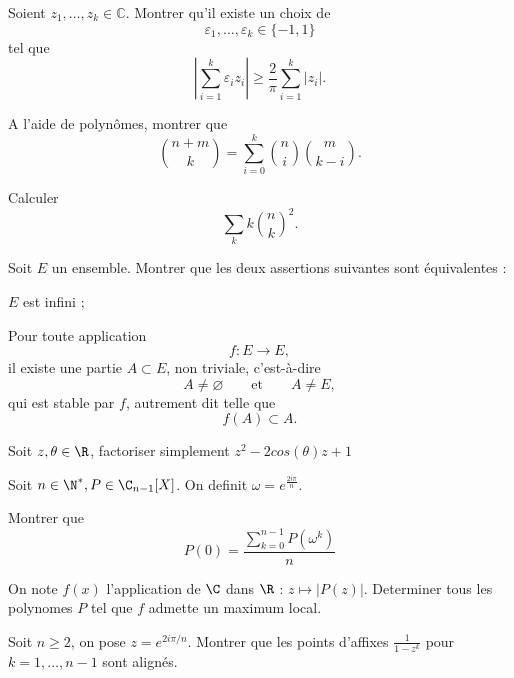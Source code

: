 \documentclass[11pt,a4paper]{article}
\begin{document}
\begin{exercise}
Soient $z_1,\ldots,z_k\in\mathbb{C}$.
Montrer qu'il existe un choix de
\[
\varepsilon_1,\ldots,\varepsilon_k\in\{-1,1\}
\]
tel que
\[
\left|\sum_{i=1}^k \varepsilon_i z_i\right|
\geq
\frac{2}{\pi}\sum_{i=1}^k |z_i|.
\]
\end{exercise}

\begin{exercise}
\begin{questions}
    A l'aide de polynômes, montrer que
    \[
    \binom{n+m}{k}
    =
    \sum_{i=0}^k
    \binom{n}{i}
    \binom{m}{k-i}.
    \]
    \item Calculer
    \[
    \sum_k k\binom{n}{k}^2.
    \]
\end{questions}
\end{exercise}
\begin{exercise}
Soit $E$ un ensemble. Montrer que les deux assertions suivantes sont équivalentes :
\begin{questions}
    \item $E$ est infini ;
    \item Pour toute application
    \[
    f:E\to E,
    \]
    il existe une partie $A\subset E$, non triviale, c'est-à-dire
    \[
    A\neq\varnothing
    \qquad\text{et}\qquad
    A\neq E,
    \]
    qui est stable par $f$, autrement dit telle que
    \[
    f(A)\subset A.
    \]
\end{questions}
\end{exercise}

\begin{exercise}
Soit $z,\theta\in\R$, factoriser simplement $z^2-2cos(\theta)z+1$
\end{exercise}

\begin{exercise}
Soit $n\in \N^*, P\in \C_{n-1}[X]$.
On definit $\omega=e^{\frac{2i\pi}n}$.
\begin{questions}
\item Montrer que $$P(0)=\frac{\sum_{k=0}^{n-1}P(\omega^k)}n$$

\item On note $f(x)$ l'application de $\C$ dans $\R$ : $z\mapsto|P(z)|$.
Determiner tous les polynomes $P$ tel que $f$ admette un maximum local. 
\end{questions}
\end{exercise}

\begin{exercise}
Soit $n\ge2$, on pose $z=e^{2i\pi/n}$.
Montrer que les points d'affixes $\frac{1}{1-z^k}$ pour $k=1,\ldots,n-1$ sont alignés.
\end{exercise}
\end{document}

